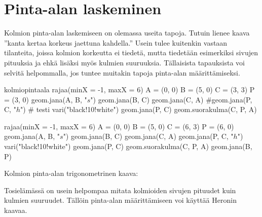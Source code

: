 \section*{Pinta-alan laskeminen}

Kolmion pinta-alan laskemiseen on olemassa useita tapoja. Tutuin lienee kaava ''kanta kertaa korkeus jaettuna kahdella.'' Usein tulee kuitenkin vastaan tilanteita, joissa kolmion korkeutta ei tiedetä, mutta tiedetään esimerkiksi sivujen pituuksia ja ehkä lisäksi myös kulmien suuruuksia. Tällaisista tapauksista voi selvitä helpommalla, jos tuntee muitakin tapoja pinta-alan määrittämiseksi.

\begin{luoKuva}{kolmiopintaala}
	rajaa(minX = -1, maxX = 6)
	A = (0, 0)
	B = (5, 0)
	C = (3, 3)
	P = (3, 0)
	geom.jana(A, B, "$s$")
	geom.jana(B, C)
	geom.jana(C, A)
	#geom.jana(P, C, "$h$") # testi
	vari("black!10!white")
	geom.jana(P, C) 
	geom.suorakulma(C, P, A)
\end{luoKuva}


\begin{center}
\begin{kuva}
	rajaa(minX = -1, maxX = 6)
	A = (0, 0)
	B = (5, 0)
	C = (6, 3)
	P = (6, 0)
	geom.jana(A, B, "$s$")
	geom.jana(B, C)
	geom.jana(C, A)
	geom.jana(P, C, "$h$")
	vari("black!10!white")
	geom.jana(P, C)
	geom.suorakulma(C, P, A)
	geom.jana(B, P)
\end{kuva}
\end{center}



Kolmion pinta-alan trigonometrinen kaava:


Tosielämässä on usein helpompaa mitata kolmioiden sivujen pituudet kuin kulmien suuruudet. Tällöin pinta-alan määrittämiseen voi käyttää Heronin kaavaa.

